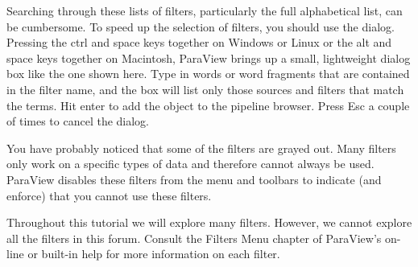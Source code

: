 


Searching through these lists of filters, particularly the full
alphabetical list, can be cumbersome.  To speed up the selection of
filters, you should use the  dialog.  Pressing the ctrl
and space keys together on Windows or Linux or the alt and space keys
together on Macintosh, ParaView brings up a small, lightweight dialog box
like the one shown here.  Type in words or word fragments that are
contained in the filter name, and the box will list only those sources and
filters that match the terms.  Hit enter to add the object to the pipeline
browser.  Press Esc a couple of times to cancel the dialog.

You have probably noticed that some of the filters are grayed out.  Many
filters only work on a specific types of data and therefore cannot always
be used.  ParaView disables these filters from the menu and toolbars to
indicate (and enforce) that you cannot use these filters.

Throughout this tutorial we will explore many filters.  However, we cannot
explore all the filters in this forum.  Consult the Filters Menu chapter of
ParaView's on-line or built-in help for more information on each filter.

